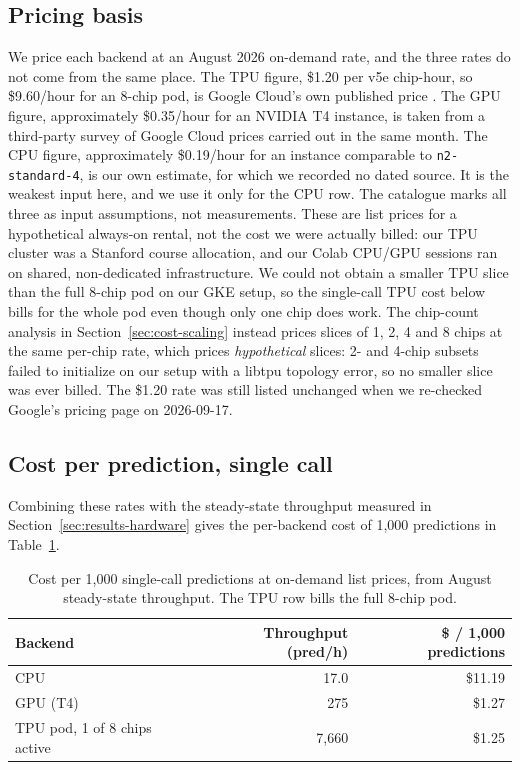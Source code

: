 
\subsection{Pricing basis}
\label{sec:cost-basis}

We price each backend at an August 2026 on-demand rate, and the three
rates do not come from the same place. The TPU figure, \$1.20 per
v5e chip-hour, so \$9.60/hour for an 8-chip pod, is Google Cloud's own
published price \citep{googletpupricing}. The GPU figure,
approximately \$0.35/hour for an NVIDIA T4 instance, is taken from a
third-party survey of Google Cloud prices carried out in the same
month. The CPU figure, approximately \$0.19/hour for an instance
comparable to \texttt{n2-standard-4}, is our own estimate, for which we
recorded no dated source. It is the weakest input here, and we use it
only for the CPU row. The catalogue marks all three as input
assumptions, not measurements. These are list prices
for a hypothetical always-on rental, not the cost we were actually
billed: our TPU cluster was a Stanford course allocation, and our
Colab CPU/GPU sessions ran on shared, non-dedicated infrastructure.
We could not obtain a smaller TPU slice than the full 8-chip pod on
our GKE setup, so the single-call TPU cost below bills for the whole
pod even though only one chip does work. The chip-count analysis in
Section~\ref{sec:cost-scaling} instead prices slices of 1, 2, 4 and 8
chips at the same per-chip rate, which prices \emph{hypothetical}
slices: 2- and 4-chip subsets failed to initialize on our setup with a
libtpu topology error, so no smaller slice was ever billed.
The \$1.20 rate was still listed unchanged when we re-checked Google's
pricing page on 2026-09-17.

\subsection{Cost per prediction, single call}
\label{sec:cost-baseline}

Combining these rates with the steady-state throughput measured in
Section~\ref{sec:results-hardware} gives the per-backend cost of 1{,}000
predictions in Table~\ref{tab:cost-baseline}.

\begin{table}[H]
\centering\small
\caption{Cost per 1{,}000 single-call predictions at on-demand list
prices, from August steady-state throughput. The TPU row bills the full
8-chip pod.}
\label{tab:cost-baseline}
\begin{tabular}{lrr}
\toprule
Backend & Throughput (pred/h) & \$ / 1{,}000 predictions \\
\midrule
CPU                          & 17.0   & \$11.19 \\
GPU (T4)                     & 275    & \$1.27  \\
TPU pod, 1 of 8 chips active & 7{,}660 & \$1.25  \\
\bottomrule
\end{tabular}
\end{table}

